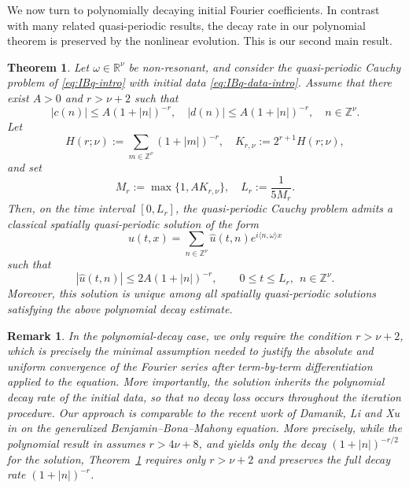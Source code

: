 \documentclass[12pt,reqno,tbtags]{amsart}
\newtheorem{theorem}{Theorem}[section]
\newtheorem{remark}{Remark}[section]
\newcommand\1{\mathbbm{1}}
\begin{document}
We now turn to polynomially decaying initial Fourier coefficients. In contrast with
many related quasi-periodic results, the decay rate in our polynomial theorem is
preserved by the nonlinear evolution. This is our second main result.

\begin{theorem}\label{thm:polynomial decay}
Let $\omega\in \mathbb{R}^{\nu}$ be non-resonant, and consider the quasi-periodic
Cauchy problem of \eqref{eq:IBq-intro}
with initial data \eqref{eq:IBq-data-intro}.
Assume that there exist $A>0$ and $r>\nu+2$ such that
\[
|c(n)|\le A(1+|n|)^{-r},
\quad
|d(n)|\le A(1+|n|)^{-r},
\quad n\in\mathbb Z^\nu.
\]
Let
\[
H(r;\nu):=\sum_{m\in\mathbb Z^\nu}(1+|m|)^{-r},
\quad
K_{r,\nu}:=2^{r+1}H(r;\nu),
\]
and set
\[
M_r:=\max\{1,A K_{r,\nu}\}, \quad
L_r:=\frac{1}{5M_r}.
\]
Then, on the time interval $[0,L_r]$, the quasi-periodic Cauchy problem admits a classical spatially
quasi-periodic solution of the form
\[
u(t,x)=\sum_{n\in\mathbb Z^\nu}\widehat u(t,n)e^{i\langle n,\omega\rangle x}
\]
such that
\[
|\widehat u(t,n)|\le 2A(1+|n|)^{-r},
\qquad
0\le t\le L_r,\ \ n\in\mathbb Z^\nu.
\]
Moreover, this solution is unique among all spatially quasi-periodic solutions
satisfying the above polynomial decay estimate.
\end{theorem}

\begin{remark} In the polynomial-decay case, we only require the condition 
$r>\nu+2$, which is precisely the minimal assumption needed to justify the absolute and uniform convergence of the Fourier series after term-by-term differentiation applied to the equation. More importantly, the solution inherits the polynomial decay rate of the initial data, so that no decay loss occurs throughout the iteration procedure. Our approach is comparable to the recent work of Damanik, Li and Xu in \cite{DLX24:JFA} on the generalized Benjamin--Bona--Mahony equation. More precisely, while the polynomial result in \cite{DLX24:JFA} assumes $r>4\nu+8$, and yields only the decay
$(1+|n|)^{-r/2}$ for the solution, Theorem~\ref{thm:polynomial decay}
requires only $r>\nu+2$ and preserves the full decay rate
$(1+|n|)^{-r}$.
\end{remark}
\end{document}
